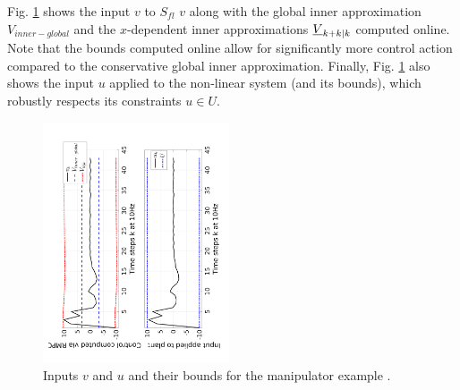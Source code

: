 



Fig. \ref{fig:v_and_limits} shows the input $v$ to $S_{fl}$ $v$ along with the global inner approximation $V_{inner-global}$ and the $x$-dependent inner approximations $\underline{V}_{k+k|k}$ computed online.
Note that the bounds computed online allow for significantly more control action compared to the conservative global inner approximation. 
Finally, Fig. \ref{fig:v_and_limits} also shows the input $u$ applied to the non-linear system (and its bounds), which robustly respects its constraints $u \in U$.



\begin{figure}
\includegraphics[angle=270,width=0.49\textwidth]{figs/u_and_v_manip.pdf}
\caption{Inputs $v$ and $u$ and their bounds for the manipulator example .}
\label{fig:v_and_limits}
\end{figure}



